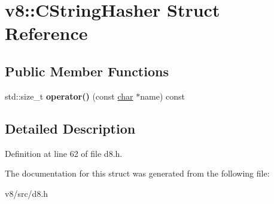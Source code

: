 \hypertarget{structv8_1_1CStringHasher}{}\section{v8\+:\+:C\+String\+Hasher Struct Reference}
\label{structv8_1_1CStringHasher}
\subsection*{Public Member Functions}
\begin{DoxyCompactItemize}
\item 
\mbox{\label{structv8_1_1CStringHasher_a3eab09a9cc5ebbbfccb519c386d6ee31}} 
std\+::size\+\_\+t {\bfseries operator()} (const \mbox{\hyperlink{classchar}{char}} $\ast$name) const
\end{DoxyCompactItemize}


\subsection{Detailed Description}


Definition at line 62 of file d8.\+h.



The documentation for this struct was generated from the following file\+:\begin{DoxyCompactItemize}
\item 
v8/src/d8.\+h\end{DoxyCompactItemize}
